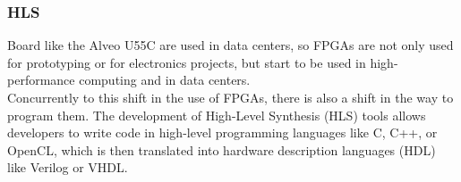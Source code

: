 \documentclass{beamer}
\begin{document}
\begin{frame}\frametitle{HLS}
Board like the Alveo U55C are used in data centers, so 
FPGAs are not only used for prototyping or for electronics
projects, but start to be used in high-performance computing
and in data centers. \\
\vspace{1.5cm}
Concurrently to this shift in the use of FPGAs, there is also a
shift in the way to program them. The development
of High-Level Synthesis (HLS) tools allows developers to
write code in high-level programming languages like C, C++,
or OpenCL, which is then translated into hardware description
languages (HDL) like Verilog or VHDL. \\
\end{frame}
\end{document}
